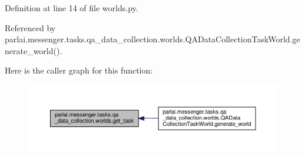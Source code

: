 Definition at line 14 of file worlds.\+py.



Referenced by parlai.\+messenger.\+tasks.\+qa\+\_\+data\+\_\+collection.\+worlds.\+Q\+A\+Data\+Collection\+Task\+World.\+generate\+\_\+world().

Here is the caller graph for this function\+:
\nopagebreak
\begin{figure}[H]
\begin{center}
\leavevmode
\includegraphics[width=350pt]{namespaceparlai_1_1messenger_1_1tasks_1_1qa__data__collection_1_1worlds_ae3e33a78819bd2723565943617193e10_icgraph}
\end{center}
\end{figure}

